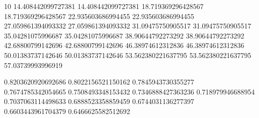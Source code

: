 \documentclass[letterpaper,10pt,english]{sphinxmanual}
\begin{document}
\begin{sphinxVerbatim}[commandchars=\\\{\}]
   
    \PYG{p}{[}\PYG{p}{]} \PYG{p}{[}\PYG{p}{]}
\end{sphinxVerbatim}

\begin{sphinxVerbatim}[commandchars=\\\{\}]
10 \PYGZhy{}\PYGZhy{}\PYGZgt{} 14.408442099727381
14.408442099727381 \PYGZhy{}\PYGZhy{}\PYGZgt{} 18.719369296428567
18.719369296428567 \PYGZhy{}\PYGZhy{}\PYGZgt{} 22.935603686994455
22.935603686994455 \PYGZhy{}\PYGZhy{}\PYGZgt{} 27.059861394093332
27.059861394093332 \PYGZhy{}\PYGZhy{}\PYGZgt{} 31.09475750905517
31.09475750905517 \PYGZhy{}\PYGZhy{}\PYGZgt{} 35.04281075996687
35.04281075996687 \PYGZhy{}\PYGZhy{}\PYGZgt{} 38.90644792273292
38.90644792273292 \PYGZhy{}\PYGZhy{}\PYGZgt{} 42.68800799142696
42.68800799142696 \PYGZhy{}\PYGZhy{}\PYGZgt{} 46.38974612312836
46.38974612312836 \PYGZhy{}\PYGZhy{}\PYGZgt{} 50.01383737142646
50.01383737142646 \PYGZhy{}\PYGZhy{}\PYGZgt{} 53.562380221637795
53.562380221637795 \PYGZhy{}\PYGZhy{}\PYGZgt{} 57.03739993996919
\end{sphinxVerbatim}

\begin{sphinxVerbatim}[commandchars=\\\{\}]
   
    \PYG{p}{[}\PYG{p}{]}\PYG{p}{[}\PYG{p}{]}
\end{sphinxVerbatim}

\begin{sphinxVerbatim}[commandchars=\\\{\}]
0.8203620920692686
0.8022156521150162
0.7845943730355277
0.7674785342054665
0.7508493348153432
0.7346888427363236
0.718979946688954
0.7037063114498633
0.6888523358859459
0.6744031136277397
0.6603443961704379
0.6466625582512692
\end{sphinxVerbatim}
\end{document}
